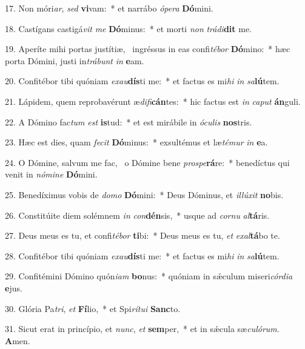 17. Non móri\textit{ar}, \textit{sed} \textbf{vi}vam:~*  et narrábo \textit{ó}\textit{pe}\textit{ra} \textbf{Dó}mini.\

18. Castígans castigá\textit{vit} \textit{me} \textbf{Dó}minus:~*  et morti \textit{non} \textit{trá}\textit{di}\textbf{dit} me.\

19. Aperíte mihi portas justítiæ, \dag\  ingréssus in eas confi\textit{té}\textit{bor} \textbf{Dó}mino:~*  hæc porta Dómini, justi in\textit{trá}\textit{bunt} \textit{in} \textbf{e}am.\

20. Confitébor tibi quóniam \textit{ex}\textit{au}\textbf{dís}ti me:~*  et factus es mi\textit{hi} \textit{in} \textit{sa}\textbf{lú}tem.\

21. Lápidem, quem reprobavérunt æ\textit{di}\textit{fi}\textbf{cán}tes:~*  hic factus est \textit{in} \textit{ca}\textit{put} \textbf{án}guli.\

22. A Dómino fac\textit{tum} \textit{est} \textbf{is}tud:~*  et est mirábile in \textit{ó}\textit{cu}\textit{lis} \textbf{nos}tris.\

23. Hæc est dies, quam \textit{fe}\textit{cit} \textbf{Dó}minus:~*  exsultémus et læ\textit{té}\textit{mur} \textit{in} \textbf{e}a.\

24. O Dómine, salvum me fac, \dag\  o Dómine bene \textit{pro}\textit{spe}\textbf{rá}re:~*  benedíctus qui venit in \textit{nó}\textit{mi}\textit{ne} \textbf{Dó}mini.\

25. Benedíximus vobis de \textit{do}\textit{mo} \textbf{Dó}mini:~*  Deus Dóminus, et \textit{il}\textit{lú}\textit{xit} \textbf{no}bis.\

26. Constitúite diem solémnem \textit{in} \textit{con}\textbf{dén}sis,~*  usque ad \textit{cor}\textit{nu} \textit{al}\textbf{tá}ris.\

27. Deus meus es tu, et confi\textit{té}\textit{bor} \textbf{ti}bi:~*  Deus meus es tu, \textit{et} \textit{ex}\textit{al}\textbf{tá}bo te.\

28. Confitébor tibi quóniam \textit{ex}\textit{au}\textbf{dís}ti me:~*  et factus es mi\textit{hi} \textit{in} \textit{sa}\textbf{lú}tem.\

29. Confitémini Dómino quón\textit{i}\textit{am} \textbf{bo}nus:~*  quóniam in sǽculum miseri\textit{cór}\textit{di}\textit{a} \textbf{e}jus.\

30. Glória Pa\textit{tri}, \textit{et} \textbf{Fí}lio,~*  et Spi\textit{rí}\textit{tu}\textit{i} \textbf{Sanc}to.\

31. Sicut erat in princípio, et \textit{nunc}, \textit{et} \textbf{sem}per,~*  et in sǽcula sæ\textit{cu}\textit{ló}\textit{rum}. \textbf{A}men.\

